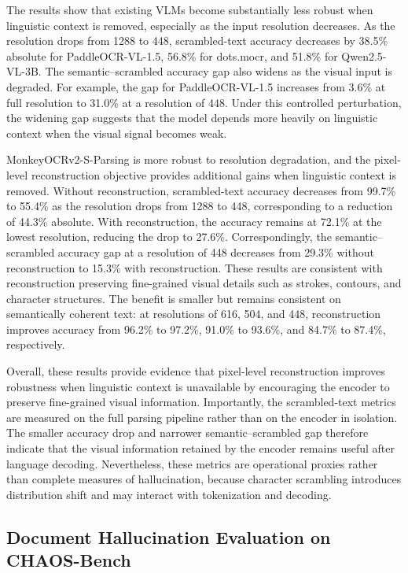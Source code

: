 \documentclass{article}
\begin{document}
    The results show that existing VLMs become substantially less robust when linguistic context is removed, especially as the input resolution decreases. As the resolution drops from 1288 to 448, scrambled-text accuracy decreases by 38.5\% absolute for PaddleOCR-VL-1.5, 56.8\% for dots.mocr, and 51.8\% for Qwen2.5-VL-3B. The semantic--scrambled accuracy gap also widens as the visual input is degraded. For example, the gap for PaddleOCR-VL-1.5 increases from 3.6\% at full resolution to 31.0\% at a resolution of 448. Under this controlled perturbation, the widening gap suggests that the model depends more heavily on linguistic context when the visual signal becomes weak.
    
    MonkeyOCRv2-S-Parsing is more robust to resolution degradation, and the pixel-level reconstruction objective provides additional gains when linguistic context is removed. Without reconstruction, scrambled-text accuracy decreases from 99.7\% to 55.4\% as the resolution drops from 1288 to 448, corresponding to a reduction of 44.3\% absolute. With reconstruction, the accuracy remains at 72.1\% at the lowest resolution, reducing the drop to 27.6\%. Correspondingly, the semantic--scrambled accuracy gap at a resolution of 448 decreases from 29.3\% without reconstruction to 15.3\% with reconstruction. These results are consistent with reconstruction preserving fine-grained visual details such as strokes, contours, and character structures. The benefit is smaller but remains consistent on semantically coherent text: at resolutions of 616, 504, and 448, reconstruction improves accuracy from 96.2\% to 97.2\%, 91.0\% to 93.6\%, and 84.7\% to 87.4\%, respectively.

    Overall, these results provide evidence that pixel-level reconstruction improves robustness when linguistic context is unavailable by encouraging the encoder to preserve fine-grained visual information. Importantly, the scrambled-text metrics are measured on the full parsing pipeline rather than on the encoder in isolation. The smaller accuracy drop and narrower semantic--scrambled gap therefore indicate that the visual information retained by the encoder remains useful after language decoding. Nevertheless, these metrics are operational proxies rather than complete measures of hallucination, because character scrambling introduces distribution shift and may interact with tokenization and decoding.


\subsection{Document Hallucination Evaluation on CHAOS-Bench}
\end{document}
